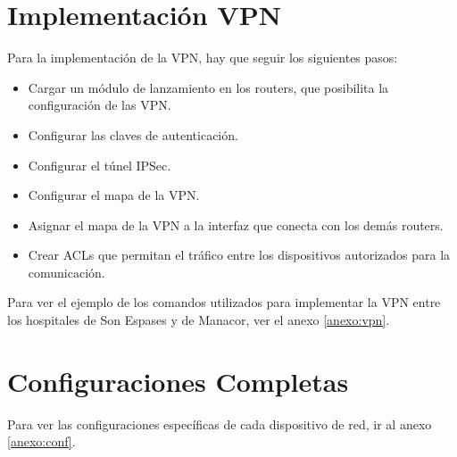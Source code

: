\section{Implementación VPN}
Para la implementación de la VPN, hay que seguir los siguientes pasos:
\begin{itemize}
    \item Cargar un módulo de lanzamiento en los routers, que posibilita la configuración de las VPN.
    \item Configurar las claves de autenticación.
    \item Configurar el túnel IPSec.
    \item Configurar el mapa de la VPN.
    \item Asignar el mapa de la VPN a la interfaz que conecta con los demás routers.
    \item Crear ACLs que permitan el tráfico entre los dispositivos autorizados para la comunicación.
\end{itemize}

Para ver el ejemplo de los comandos utilizados para implementar la VPN entre los hospitales de Son Espases y de Manacor, ver el anexo \ref{anexo:vpn}.

\section{Configuraciones Completas}
Para ver las configuraciones específicas de cada dispositivo de red, ir al anexo \ref{anexo:conf}.
